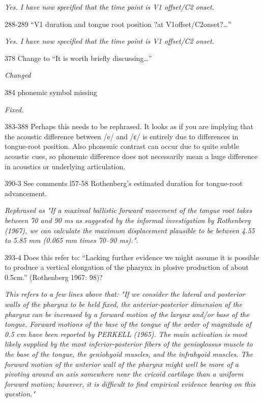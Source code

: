 \documentclass[]{article}
\begin{document}
\begin{adjustwidth}{1cm}{} \textit{
Yes. I have now specified that the time point is V1 offset/C2 onset.
} \end{adjustwidth}

288-289 ``V1 duration and tongue root position ?at
V1offset/C2onset?\ldots{}''

\begin{adjustwidth}{1cm}{} \textit{
Yes. I have now specified that the time point is V1 offset/C2 onset.
} \end{adjustwidth}

378 Change to ``It is worth briefly discussing\ldots{}''

\begin{adjustwidth}{1cm}{} \textit{
Changed
} \end{adjustwidth}

384 phonemic symbol missing

\begin{adjustwidth}{1cm}{} \textit{
Fixed.
} \end{adjustwidth}

383-388 Perhaps this needs to be rephrased. It looks as if you are
implying that the acoustic difference between /e/ and /ɛ/ is entirely
due to differences in tongue-root position. Also phonemic contrast can
occur due to quite subtle acoustic cues, so phonemic difference does not
necessarily mean a huge difference in acoustics or underlying
articulation.

390-3 See comments l57-58 Rothenberg's estimated duration for
tongue-root advancement.

\begin{adjustwidth}{1cm}{} \textit{
Rephrased as "If a maximal ballistic forward movement of the tongue root takes between 70 and 90 ms as suggested by the informal investigation by Rothenberg (1967), we can calculate the maximum displacement plausible to be between 4.55 to 5.85 mm (0.065 mm times 70–90 ms).".
} \end{adjustwidth}

393-4 Does this refer to: ``Lacking further evidence we might assume it
is possible to produce a vertical elongation of the pharynx in plosive
production of about 0.5cm.'' (Rothenberg 1967: 98)?

\begin{adjustwidth}{1cm}{} \textit{
This refers to a few lines above that: "If we consider the lateral and posterior walls of the pharynx to be held fixed, the anterior-posterior dimension of the pharynx can be increased by a forward motion of the larynx and/or base of the tongue. Forward motions of the base of the tongue of the order of magnitude of 0.5 cm have been reported by PERKELL (1965). The main activation is most likely supplied by the most inferior-posterior fibers of the genioglossus muscle to the base of the tongue, the geniohyoid muscles, and the infrahyoid muscles. The forward motion of the anterior wall of the pharynx might well be more of a pivoting around an axis somewhere near the cricoid cartilage than a uniform forward motion; however, it is difficult to find empirical evidence bearing on this question."
} \end{adjustwidth}
\end{document}

